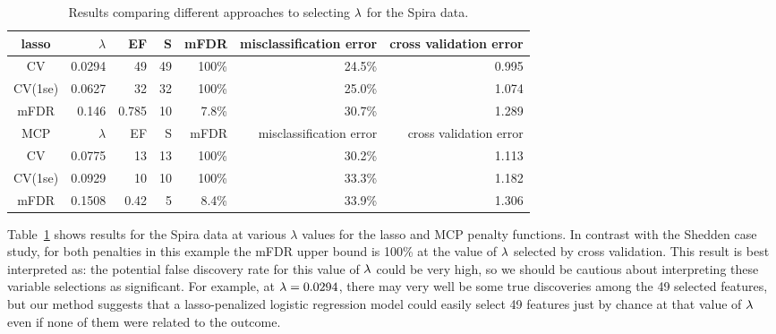 \begin{table}[htb!]
\centering
\begin{tabular}{c | r r r r r r }
  \hline
lasso & $\lambda$ & EF & S & mFDR & misclassification error & cross validation error \\ 
	\hline
	CV & 0.0294 & 49 & 49 & 100\% & 24.5\% & 0.995 \\
	CV(1se) & 0.0627 & 32 & 32 & 100\% & 25.0\% & 1.074 \\
	mFDR & 0.146 & 0.785 & 10 & 7.8\% &  30.7\% & 1.289 \\
\hline
MCP & $\lambda$ & EF & S & mFDR & misclassification error & cross validation error \\
	\hline
	CV & 0.0775 & 13 & 13 & 100\% & 30.2\% & 1.113 \\
	CV(1se) & 0.0929 & 10 & 10 & 100\% & 33.3\% & 1.182 \\
	mFDR & 0.1508 & 0.42 & 5 & 8.4\% &  33.9\% & 1.306 \\
		\hline
\end{tabular}
\caption{\label{Tab:spira} Results comparing different approaches to selecting $\lambda$ for the Spira data.}
\end{table}

Table~\ref{Tab:spira} shows results for the Spira data at various $\lambda$ values for the lasso and MCP penalty functions.  In contrast with the Shedden case study, for both penalties in this example the mFDR upper bound is 100\% at the value of $\lambda$ selected by cross validation.  This result is best interpreted as: the potential false discovery rate for this value of $\lambda$ could be very high, so we should be cautious about interpreting these variable selections as significant.  For example, at $\lambda=0.0294$, there may very well be some true discoveries among the 49 selected features, but our method suggests that a lasso-penalized logistic regression model could easily select 49 features just by chance at that value of $\lambda$ even if none of them were related to the outcome.


